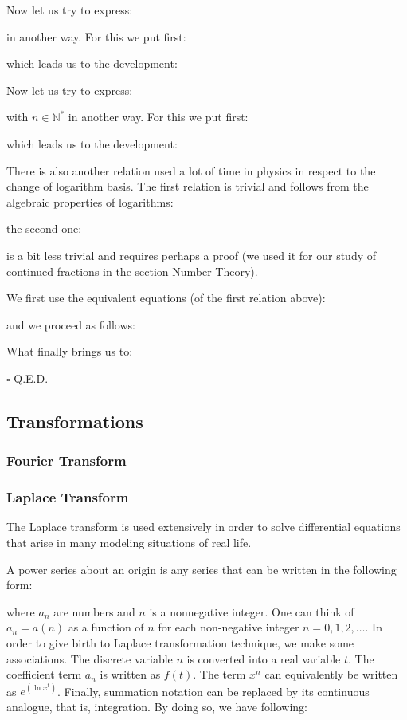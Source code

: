 	Now let us try to express:
	
	in another way. For this we put first:
	
	which leads us to the development:
	
	Now let us try to express:
	
	with $n\in \mathbb{N}^{*}$ in another way. For this we put first:
	
	which leads us to the development:
	
	There is  also another relation used a lot of time in physics in respect to the change of logarithm basis. The first relation is trivial and follows from the algebraic properties of logarithms:
	
	the second one:
	
	is a bit less trivial and requires perhaps a proof (we used it for our study of continued fractions in the section Number Theory).
	\begin{dem}
	We first use the equivalent equations (of the first relation above):
	
	and we proceed as follows:
	
	What finally brings us to:
	
	\begin{flushright}
		$\square$  Q.E.D.
	\end{flushright}
	\end{dem}

	\pagebreak
	\subsection{Transformations}
	\subsubsection{Fourier Transform}
	\subsubsection{Laplace Transform}
	The Laplace transform is used extensively  in order to solve  differential equations that arise in many modeling situations of real life. 

	A power series about an origin is any series that can be written in the following form:

	where $a_n$ are  numbers and $n$ is a nonnegative integer. One can think of $a_n = a(n)$ as a function of $n$ for each non-negative integer $n = 0, 1, 2, \ldots$. In order to give birth to Laplace transformation technique, we  make some associations. The discrete variable $n$ is converted into a real variable $t$. The coefficient term $a_n$ is written as $f(t)$. The term $x^n$ can equivalently be written as $e^{(\ln x^t)}$. Finally, summation notation can be replaced by its continuous analogue, that is, integration. By doing so, we have following:
	 
